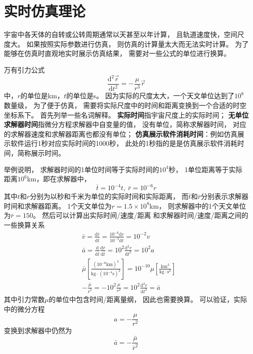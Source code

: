 \section{实时仿真理论}
宇宙中各天体的自转或公转周期通常以天甚至以年计算，
且轨道速度快，空间尺度大。
如果按照实际参数进行仿真，
则仿真的计算量太大而无法实时计算。
为了能够在仿真时直观地实时展示仿真结果，
需要对一些公式的单位进行换算。

万有引力公式
\begin{equation}
    \frac{\text{d}^2\vec{r}}{\text{d}t^2}=-\frac{\mu}{r^3}\vec{r} \label{eqRealGravity}
\end{equation}
中，$r$的单位是km，$t$的单位是s。
因为实际的尺度太大，一个天文单位达到了$10^8$数量级，
为了便于仿真，
需要将实际尺度中的时间和距离变换到一个合适的时空坐标系下。
首先列举一些名词解释。
\textbf{实际时间}指宇宙尺度上的实际时间；
\textbf{无单位求解器时间}指微分方程求解器中自变量的值，
没有单位，简称求解器时间，
对应的求解器速度和求解器距离也都没有单位；
\textbf{仿真展示软件消耗时间}：例如仿真展示软件运行1秒对应实际时间的1000秒，
此处的1秒指的是是仿真展示软件消耗时间，简称展示时间。

举例说明，
求解器时间的1单位时间等于实际时间的$10^4$秒，
1单位距离等于实际距离$10^6$km，即在求解器中，
\begin{equation}
    \bar{t}=10^{-4}t,\ \bar{r}=10^{-6}r \label{eqRealConvert}
\end{equation}
其中$t$和$r$分别为以秒和千米为单位的实际时间和实际距离，
而$\bar{t}$和$\bar{r}$分别表示求解器时间和求解器距离。
1个天文单位为$r=1.5\times10^8$km，
则求解器中的1个天文单位为$\bar{r}=150$。
然后可以计算出实际时间/速度/距离
和求解器时间/速度/距离之间的一些换算关系
\begin{align*}
&\bar{v} = \frac{\text{d}\bar{r}}{\text{d}\bar{t}}
 = \frac{10^{-6}\text{d}r}{10^{-4}\text{d}t} = 10^{-2}v \\
&\bar{a} = \frac{\text{d}}{\text{d}\bar{t}}\frac{\text{d}\bar{r}}{\text{d}\bar{t}}
 = 10^2\frac{\text{d}^2r}{\text{d}t^2} = 10^2a \\
&\bar{\mu}\left[\frac{(10^{-6}\text{km})^3}{\text{kg}\cdot(10^{-4}\text{s})^2}\right]
 = 10^{-10}\mu\left[\frac{\text{km}^3}{\text{kg}\cdot \text{s}^2}\right] \\
&-\frac{\bar{\mu}}{\bar{r}^2} = -10^2\frac{\mu}{r^2}
 = 10^2\frac{\text{d}^2r}{\text{d}t^2} = \bar{a}
\end{align*}
其中引力常数$\mu$的单位中包含时间/距离量纲，
因此也需要换算。
可以验证，实际中的微分方程
$$a=-\frac{\mu}{r^2}$$
变换到求解器中仍然为
$$\bar{a}=-\frac{\bar{\mu}}{\bar{r}^2}$$


